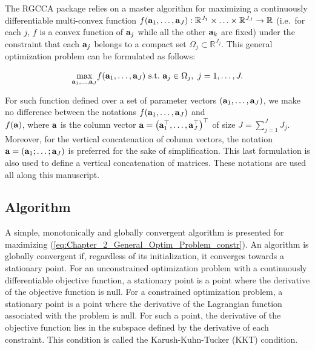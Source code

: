 \documentclass[
]{jss}
\begin{document}
The RGCCA package relies on a master algorithm for maximizing a
continuously differentiable multi-convex function
\(f(\mathbf{a}_1, \ldots,\mathbf{a}_J):\mathbb{R}^{J_1}\times \ldots \times \mathbb{R}^{J_J} \xrightarrow{}\mathbb{R}\)
(i.e.~for each \(j\), \(f\) is a convex function of \(\mathbf{a}_j\) while
all the other \(\mathbf{a}_k\) are fixed) under the constraint that each
\(\mathbf{a}_j\) belongs to a compact set
\(\Omega_j\subset \mathbb{R}^{J_j}\). This general optimization problem
can be formulated as follows:

\begin{align}
\underset{\mathbf{a}_1, \ldots,\mathbf{a}_J}{\text{max}} f(\mathbf{a}_1, \ldots,\mathbf{a}_J)
\text{~s.t.~} \mathbf{a}_j \in \Omega_j, ~ j = 1, \ldots, J.
\label{eq:Chapter_2_General_Optim_Problem_constr}
\end{align}

For such function defined over a set of parameter vectors
\((\mathbf{a}_1, \ldots,\mathbf{a}_J)\), we make no difference between the
notations \(f(\mathbf{a}_1, \ldots,\mathbf{a}_J)\) and\\
\(f(\mathbf{a})\), where \(\mathbf{a}\) is the column vector
\(\mathbf{a} = \left( \mathbf{a}_1^\top, \ldots, \mathbf{a}_J^\top\right)^\top\) of
size \(J = \sum_{j=1}^{J}J_j\). Moreover, for the vertical concatenation
of column vectors, the notation
\(\mathbf{a} = \left( \mathbf{a}_1; \ldots; \mathbf{a}_J \right)\) is preferred for the
sake of simplification. This last formulation is also used to define a
vertical concatenation of matrices. These notations are used all along
this manuscript.

\hypertarget{algorithm}{%
\subsection{Algorithm}\label{algorithm}}

A simple, monotonically and globally convergent algorithm is presented
for maximizing (\ref{eq:Chapter_2_General_Optim_Problem_constr}). An
algorithm is globally convergent if, regardless of its initialization,
it converges towards a stationary point. For an unconstrained
optimization problem with a continuously differentiable objective
function, a stationary point is a point where the derivative of the
objective function is null. For a constrained optimization problem, a
stationary point is a point where the derivative of the Lagrangian
function associated with the problem is null. For such a point, the
derivative of the objective function lies in the subspace defined by the
derivative of each constraint. This condition is called the
Karush-Kuhn-Tucker (KKT) condition.
\end{document}
